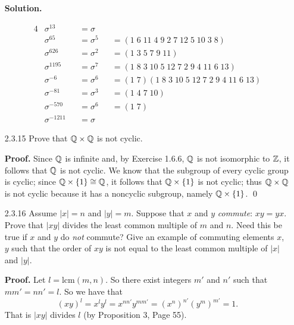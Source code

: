 \begin{enumerate}
      \textbf{Solution.}
      
      \begin{alignat*}{4}
         &\sigma^{13}   &&= \sigma &&\text{ } \\
         &\sigma^{65}   &&= \sigma^5 &&=
            (1\;6\;11\;4\;9\;2\;7\;12\;5\;10\;3\;8) \\
         &\sigma^{626}  &&= \sigma^2 &&= (1\;3\;5\;7\;9\;11) \\
         &\sigma^{1195} &&= \sigma^7 &&=
            (1\;8\;3\;10\;5\;12\;7\;2\;9\;4\;11\;6\;13) \\
         &\sigma^{-6} &&= \sigma^6 &&= (1\;7)
            (1\;8\;3\;10\;5\;12\;7\;2\;9\;4\;11\;6\;13) \\
         &\sigma^{-81} &&= \sigma^3 &&= (1\;4\;7\;10) \\
         &\sigma^{-570} &&= \sigma^6 &&= (1\;7) \\
         &\sigma^{-1211} &&= \sigma
      \end{alignat*}
   \item[2.3.15]  Prove that $\mathbb{Q} \times \mathbb{Q}$ is not cyclic.
   
      \textbf{Proof.} Since $\mathbb{Q}$ is infinite and, by Exercise 1.6.6, $\mathbb{Q}$ is not
      isomorphic to $\mathbb{Z}$, it follows that $\mathbb{Q}$ is not cyclic. We know that the
      subgroup of every cyclic group is cyclic; since $\mathbb{Q} \times\{1\} \cong \mathbb{Q}$,
      it follows that $\mathbb{Q} \times \{1\}$ is not cyclic; thus $\mathbb{Q} \times \mathbb{Q}$ is
      not cyclic because it has a noncyclic subgroup, namely $\mathbb{Q} \times \{1\}$.
      \qed
   \item[2.3.16]  Assume $|x| = n$ and $|y| = m$. Suppose that $x$ and $y$
                  \textit{commute}: $xy = yx$. Prove that $|xy|$ divides the
                  least common multiple of $m$ and $n$. Need this be true if $x$
                  and $y$ do \textit{not} commute? Give an example of commuting
                  elements $x$, $y$ such that the order of $xy$ is not equal to
                  the least common multiple of $|x|$ and $|y|$.
                  
      \textbf{Proof.} Let $l = \text{lcm}(m, n)$. So there exist integers
      $m'$ and $n'$ such that $mm' = nn' = l$. So we have that
      $$(xy)^l = x^ly^l = x^{nn'}y^{mm'} = (x^n)^{n'}(y^m)^{m'} = 1.$$
      That is $|xy|$ divides $l$ (by Proposition 3, Page 55).
      

\end{enumerate}
